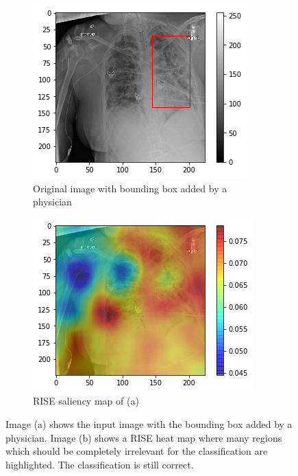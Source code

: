\begin{figure}[H]
    \centering
    \begin{subfigure}[t]{.45\textwidth}
        \centering
        \includegraphics[width=\linewidth]{chapters/03_classification/images/rise2_bbox.png}
        \caption{Original image with bounding box added by a physician}
    \end{subfigure}\hspace{1cm}%
    \begin{subfigure}[t]{.45\textwidth}
        \centering
        \includegraphics[width=\linewidth]{chapters/03_classification/images/rise2_saliency.png}
        \caption{RISE saliency map of (a)}
    \end{subfigure}
    \caption{Image (a) shows the input image with the bounding box added by a physician. Image (b) shows a RISE heat map where many regions which should be completely irrelevant for the classification are highlighted. The classification is still correct.}
    \label{rise_example_3}
\end{figure}



